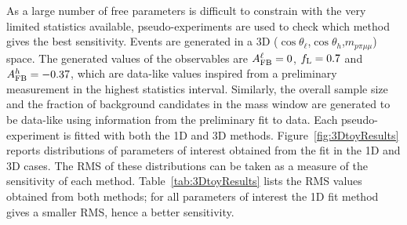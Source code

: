 As a large number of free parameters is difficult to constrain with the very limited statistics available, 
%
pseudo-experiments are used to check which method gives the best sensitivity.
Events are generated in a 3D ($\cos\theta_\ell$,$\cos\theta_h$,$m_{p\pi\mu\mu}$) space.
The generated values of the observables are $A_{\rm FB}^\ell = 0$, $f_{\rm L} = 0.7$ 
and $A_{\rm FB}^h = -0.37$, which are data-like values inspired from a preliminary measurement
in the highest statistics interval. Similarly, the overall sample size and the fraction of background candidates
in the mass window are generated to be data-like using information from the preliminary fit to data.
%
Each pseudo-experiment is fitted with both the 1D and 3D methods. Figure~\ref{fig:3DtoyResults} reports 
distributions of parameters of interest obtained from the fit in the 1D and 3D cases.
The RMS of these distributions can be taken as a measure of the sensitivity of each method.
Table~\ref{tab:3DtoyResults} lists the RMS values obtained from both methods; for all parameters 
of interest the 1D fit method gives a smaller RMS, hence a better sensitivity.
%
\begin{table}[hb]
\centering
\caption{RMS values for pseudo-experiments on the extraction of the three parameters
of interests with the 1D or 3D fitting methods.}
\label{tab:3DtoyResults}
\end{table}

